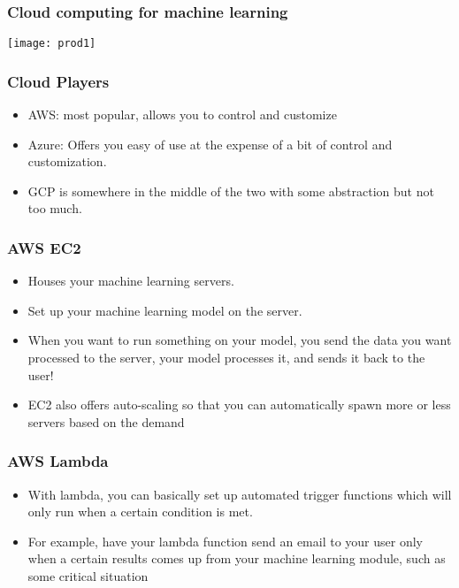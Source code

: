 \begin{frame}\frametitle{Cloud computing for machine learning}
\begin{center}
\texttt{[image: prod1]}
\end{center}
\end{frame}

\begin{frame}\frametitle{Cloud Players}
\begin{itemize}
\item AWS: most popular, allows you to control and customize 
\item Azure: Offers you easy of use at the expense of a bit of control and customization. 
\item GCP is somewhere in the middle of the two with some abstraction but not too much.
\end{itemize}
\end{frame}

\begin{frame}\frametitle{AWS EC2}
\begin{itemize}
\item Houses your machine learning servers. 
\item Set up your machine learning model on the server. 
\item When you want to run something on your model, you send the data you want processed to the server, your model processes it, and sends it back to the user! 
\item EC2 also offers auto-scaling so that you can automatically spawn more or less servers based on the demand
\end{itemize}
\end{frame}

\begin{frame}\frametitle{AWS Lambda}
\begin{itemize}
\item With lambda, you can basically set up automated trigger functions which will only run when a certain condition is met. 
\item For example, have your lambda function send an email to your user only when a certain results comes up from your machine learning module, such as some critical situation
\end{itemize}
\end{frame}

